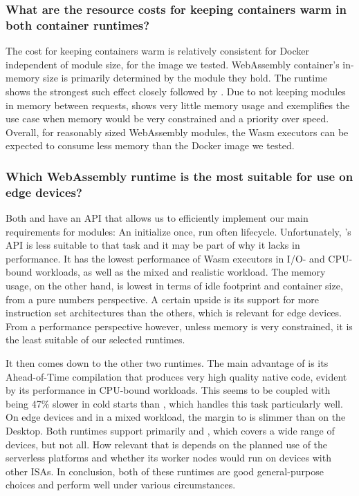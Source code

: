 \subsubsection*{What are the resource costs for keeping containers warm in both container runtimes?}

The cost for keeping containers warm is relatively consistent for Docker independent of module size, for the image we tested. WebAssembly container's in-memory size is primarily determined by the module they hold. The  runtime shows the strongest such effect closely followed by . Due to not keeping modules in memory between requests,  shows very little memory usage and exemplifies the use case when memory would be very constrained and a priority over speed. Overall, for reasonably sized WebAssembly modules, the Wasm executors can be expected to consume less memory than the Docker image we tested.

\subsubsection*{Which WebAssembly runtime is the most suitable for use on edge devices?}

Both  and  have an API that allows us to efficiently implement our main requirements for modules: An initialize once, run often lifecycle. Unfortunately, 's API is less suitable to that task and it may be part of why it lacks in performance. It has the lowest performance of Wasm executors in I/O- and CPU-bound workloads, as well as the mixed and realistic workload. The memory usage, on the other hand, is lowest in terms of idle footprint and container size, from a pure numbers perspective. A certain upside is its support for more instruction set architectures than the others, which is relevant for edge devices. From a performance perspective however, unless memory is very constrained, it is the least suitable of our selected runtimes.

It then comes down to the other two runtimes. The main advantage of  is its Ahead-of-Time compilation that produces very high quality native code, evident by its performance in CPU-bound workloads. This seems to be coupled with being 47\% slower in cold starts than , which handles this task particularly well. On edge devices and in a mixed workload, the margin to  is slimmer than on the Desktop. Both runtimes support primarily  and , which covers a wide range of devices, but not all. How relevant that is depends on the planned use of the serverless platforms and whether its worker nodes would run on devices with other ISAs.
In conclusion, both of these runtimes are good general-purpose choices and perform well under various circumstances.
